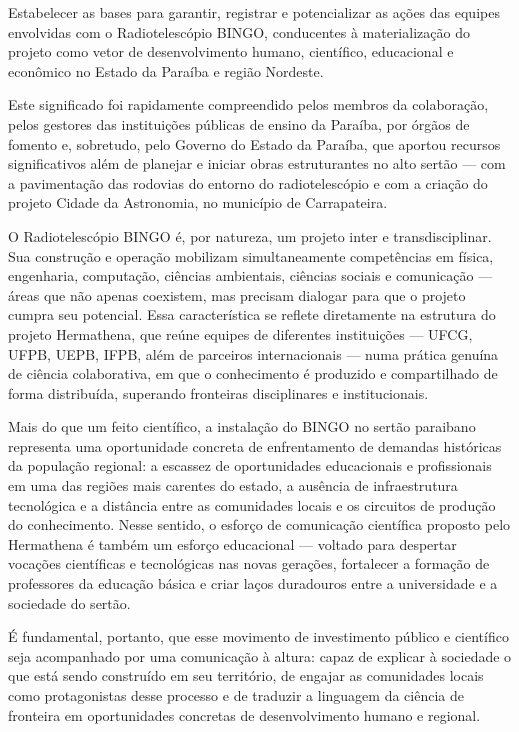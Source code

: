Estabelecer as bases para garantir, registrar e potencializar as ações das equipes envolvidas com o Radiotelescópio BINGO, conducentes à materialização do projeto como vetor de desenvolvimento humano, científico, educacional e econômico no Estado da Paraíba e região Nordeste.

Este significado foi rapidamente compreendido pelos membros da colaboração, pelos gestores das instituições públicas de ensino da Paraíba, por órgãos de fomento e, sobretudo, pelo Governo do Estado da Paraíba, que aportou recursos significativos além de planejar e iniciar obras estruturantes no alto sertão --- com a pavimentação das rodovias do entorno do radiotelescópio e com a criação do projeto Cidade da Astronomia, no município de Carrapateira.

O Radiotelescópio BINGO é, por natureza, um projeto inter e transdisciplinar. Sua construção e operação mobilizam simultaneamente competências em física, engenharia, computação, ciências ambientais, ciências sociais e comunicação --- áreas que não apenas coexistem, mas precisam dialogar para que o projeto cumpra seu potencial. Essa característica se reflete diretamente na estrutura do projeto Hermathena, que reúne equipes de diferentes instituições --- UFCG, UFPB, UEPB, IFPB, além de parceiros internacionais --- numa prática genuína de ciência colaborativa, em que o conhecimento é produzido e compartilhado de forma distribuída, superando fronteiras disciplinares e institucionais.

Mais do que um feito científico, a instalação do BINGO no sertão paraibano representa uma oportunidade concreta de enfrentamento de demandas históricas da população regional: a escassez de oportunidades educacionais e profissionais em uma das regiões mais carentes do estado, a ausência de infraestrutura tecnológica e a distância entre as comunidades locais e os circuitos de produção do conhecimento. Nesse sentido, o esforço de comunicação científica proposto pelo Hermathena é também um esforço educacional --- voltado para despertar vocações científicas e tecnológicas nas novas gerações, fortalecer a formação de professores da educação básica e criar laços duradouros entre a universidade e a sociedade do sertão.

É fundamental, portanto, que esse movimento de investimento público e científico seja acompanhado por uma comunicação à altura: capaz de explicar à sociedade o que está sendo construído em seu território, de engajar as comunidades locais como protagonistas desse processo e de traduzir a linguagem da ciência de fronteira em oportunidades concretas de desenvolvimento humano e regional.

